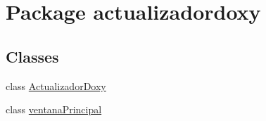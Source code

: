 \hypertarget{namespaceactualizadordoxy}{}\section{Package actualizadordoxy}
\label{namespaceactualizadordoxy}
\subsection*{Classes}
\begin{DoxyCompactItemize}
\item 
class \mbox{\hyperlink{classactualizadordoxy_1_1_actualizador_doxy}{Actualizador\+Doxy}}
\item 
class \mbox{\hyperlink{classactualizadordoxy_1_1ventana_principal}{ventana\+Principal}}
\end{DoxyCompactItemize}
